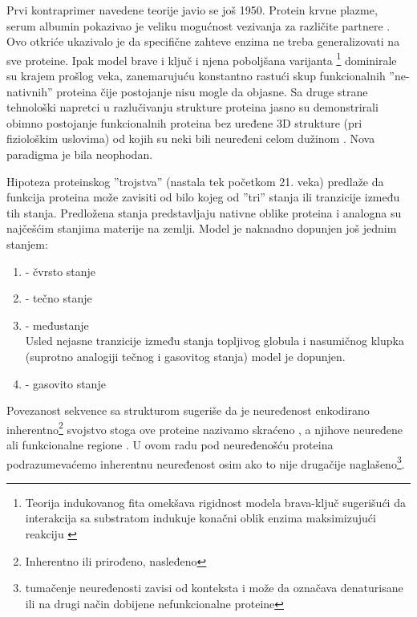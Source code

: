 Prvi kontraprimer navedene teorije javio se još 1950. Protein krvne plazme, serum
albumin pokazivao je veliku mogućnost vezivanja za različite
partnere \parencite{dunker2001}. Ovo otkriće ukazivalo je da specifične zahteve
enzima ne treba generalizovati na sve proteine. Ipak model brave i ključ i
njena poboljšana varijanta \footnote{ Teorija
indukovanog fita omekšava rigidnost modela brava-ključ sugerišući da interakcija
sa substratom indukuje konačni oblik enzima maksimizujući
reakciju \parencite{biology}}  dominirale su krajem
prošlog veka, zanemarujuću konstantno rastući skup funkcionalnih
''ne-nativnih'' proteina čije postojanje nisu mogle da objasne. Sa druge strane
tehnološki napretci u razlučivanju strukture proteina jasno su demonstrirali
obimno postojanje funkcionalnih proteina bez uređene 3D strukture (pri
fiziološkim uslovima)  od kojih su neki bili neuređeni celom
dužinom \parencite{dunker2001}.  Nova paradigma je bila neophodan.

Hipoteza proteinskog ''trojstva'' \parencite{dunker2001} (nastala tek početkom
21. veka) predlaže da funkcija proteina može zavisiti od bilo kojeg od ''tri''
stanja ili tranzicije između tih stanja. Predložena stanja predstavljaju
nativne oblike proteina i analogna su najčešćim stanjima materije na zemlji.
Model je naknadno dopunjen još jednim stanjem:
\begin{enumerate}
  \item {} - čvrsto stanje

  \item {}  - tečno stanje

  \item {}  - međustanje\\ 
    Usled nejasne tranzicije između stanja topljivog globula i nasumičnog
    klupka (suprotno analogiji tečnog i gasovitog stanja) \parencite{dunker2001}
    model je dopunjen.

  \item {}  - gasovito stanje
\end{enumerate}

Povezanost sekvence sa strukturom sugeriše da je neuređenost enkodirano
inherentno\footnote{ Inherentno ili prirođeno, nasleđeno} svojstvo \parencite{dunker2001}
stoga ove proteine nazivamo 
 skraćeno , a njihove neuređene
ali funkcionalne regione  \parencite{uversky2016}. U ovom radu pod
neuređenošću proteina podrazumevaćemo inherentnu neuređenost osim ako to nije
drugačije naglašeno\footnote{ tumačenje neuređenosti zavisi od konteksta i može
  da označava denaturisane ili na drugi način dobijene nefunkcionalne
proteine}.

